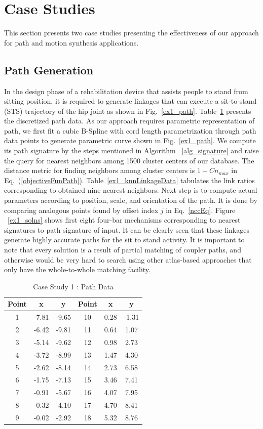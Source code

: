 \documentclass[twocolumn,10pt]{asme2ej}
\newcommand{\req}[1]{(\ref{#1})}
\begin{document}
\section{Case Studies}\label{sec_example}
This section presents two case studies presenting the effectiveness of our approach for path and motion synthesis applications.
\subsection{Path Generation}
In the design phase of a rehabilitation device that assists people to stand from sitting position, it is required to generate linkages that can execute a sit-to-stand (STS) trajectory of the hip joint as shown in Fig.~\ref{ex1_path}.
Table~\ref{hipPathTab} presents the discretized path data.
As our approach requires parametric representation of path, we first fit a cubic B-Spline with cord length parametrization through path data points to generate parametric curve shown in Fig.~\ref{ex1_path}.
We compute its path signature by the steps mentioned in Algorithm ~\ref{alg_signature} and raise the query for nearest neighbors among 1500 cluster centers of our database.
The distance metric for finding neighbors among cluster centers is $1-Cn_{max}$ in Eq.~\req{objectiveFunPath}.
Table~\ref{ex1_knnLinkageData} tabulates the link ratios corresponding to obtained nine nearest neighbors.
Next step is to compute actual parameters according to position, scale, and orientation of the path.
It is done by comparing analogous points found by offset index $j$ in Eq.~\ref{nccEq}.
Figure ~\ref{ex1_solns} shows first eight four-bar mechanisms corresponding to nearest signatures to path signature of input.
It can be clearly seen that these linkages generate highly accurate paths for the sit to stand activity.
It is important to note that every solution is a result of partial matching of coupler paths, and otherwise would be very hard to search using other atlas-based approaches that only have the whole-to-whole matching facility.

\begin{table}
\caption{Case Study 1 : Path Data}
\centering
\label{hipPathTab}
\begin{tabular}{cccccc}
\hline
Point & x & y & Point & x & y \\
\hline
1 & -7.81 & -9.65 & 10 & 0.28 & -1.31 \\
2 & -6.42 & -9.81 & 11 & 0.64 & 1.07 \\
3 & -5.14 & -9.62 & 12 & 0.98 & 2.73 \\
4 & -3.72 & -8.99 & 13 & 1.47 & 4.30 \\
5 & -2.62 & -8.14 & 14 & 2.73 & 6.58 \\
6 & -1.75 & -7.13 & 15 & 3.46 & 7.41 \\
7 & -0.91 & -5.67 & 16 & 4.07 & 7.95 \\
8 & -0.32 & -4.10 & 17 & 4.70 & 8.41 \\
9 & -0.02 & -2.92 & 18 & 5.32 & 8.76 \\
\end{tabular}
\end{table}
\end{document}
